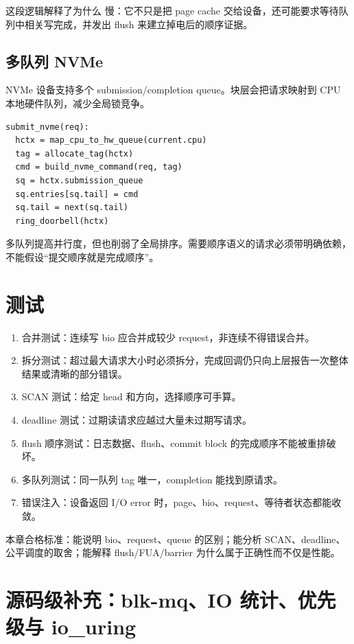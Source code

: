 这段逻辑解释了为什么  慢：它不只是把 page cache 交给设备，还可能要求等待队列中相关写完成，并发出 flush 来建立掉电后的顺序证据。

\subsection{多队列 NVMe}

NVMe 设备支持多个 submission/completion queue。块层会把请求映射到 CPU 本地硬件队列，减少全局锁竞争。

\begin{lstlisting}
submit_nvme(req):
  hctx = map_cpu_to_hw_queue(current.cpu)
  tag = allocate_tag(hctx)
  cmd = build_nvme_command(req, tag)
  sq = hctx.submission_queue
  sq.entries[sq.tail] = cmd
  sq.tail = next(sq.tail)
  ring_doorbell(hctx)
\end{lstlisting}

多队列提高并行度，但也削弱了全局排序。需要顺序语义的请求必须带明确依赖，不能假设“提交顺序就是完成顺序”。

\section{测试}

\begin{enumerate}
\tightlist
\item 合并测试：连续写 bio 应合并成较少 request，非连续不得错误合并。
\item 拆分测试：超过最大请求大小时必须拆分，完成回调仍只向上层报告一次整体结果或清晰的部分错误。
\item SCAN 测试：给定 head 和方向，选择顺序可手算。
\item deadline 测试：过期读请求应越过大量未过期写请求。
\item flush 顺序测试：日志数据、flush、commit block 的完成顺序不能被重排破坏。
\item 多队列测试：同一队列 tag 唯一，completion 能找到原请求。
\item 错误注入：设备返回 I/O error 时，page、bio、request、等待者状态都能收敛。
\end{enumerate}

\begin{rubricbox}
本章合格标准：能说明 bio、request、queue 的区别；能分析 SCAN、deadline、公平调度的取舍；能解释 flush/FUA/barrier 为什么属于正确性而不仅是性能。
\end{rubricbox}

\section{源码级补充：blk-mq、IO 统计、优先级与 io\_uring}

